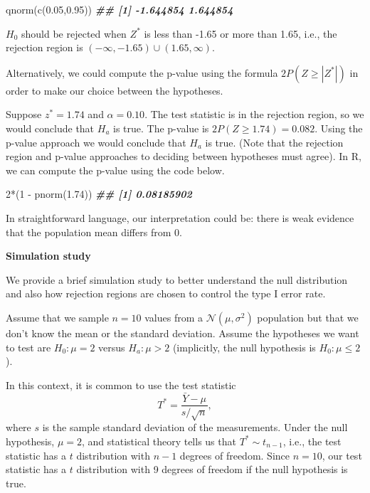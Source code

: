 \documentclass[
]{book}
\newenvironment{Shaded}{\begin{snugshade}}{\end{snugshade}}
\newcommand{\DecValTok}[1]{\textcolor[rgb]{0.00,0.00,0.81}{#1}}
\newcommand{\DocumentationTok}[1]{\textcolor[rgb]{0.56,0.35,0.01}{\textbf{\textit{#1}}}}
\newcommand{\FloatTok}[1]{\textcolor[rgb]{0.00,0.00,0.81}{#1}}
\newcommand{\FunctionTok}[1]{\textcolor[rgb]{0.00,0.00,0.00}{#1}}
\newcommand{\NormalTok}[1]{#1}
\newcommand{\SpecialCharTok}[1]{\textcolor[rgb]{0.00,0.00,0.00}{#1}}
\theoremstyle{definition}
\theoremstyle{definition}
\theoremstyle{definition}
\theoremstyle{definition}
\theoremstyle{remark}
\begin{document}
\begin{Shaded}
\begin{Highlighting}[]
\FunctionTok{qnorm}\NormalTok{(}\FunctionTok{c}\NormalTok{(}\FloatTok{0.05}\NormalTok{,}\FloatTok{0.95}\NormalTok{))}
\DocumentationTok{\#\# [1] {-}1.644854  1.644854}
\end{Highlighting}
\end{Shaded}

\(H_0\) should be rejected when \(Z^*\) is less than -1.65 or more than
1.65, i.e., the rejection region is \((-\infty, -1.65)\cup(1.65,\infty)\).

Alternatively, we could compute the p-value using the formula
\(2P(Z\geq |Z^*|)\) in order to make our choice between the hypotheses.

Suppose \(z^*=1.74\) and \(\alpha=0.10\). The test statistic is in the rejection region, so we would conclude that \(H_a\)
is true. The p-value is \(2P(Z\geq 1.74)=0.082\). Using the p-value approach we would conclude that \(H_a\) is true. (Note that the rejection region and p-value approaches to deciding between hypotheses must agree). In R, we can compute the p-value using the code below.

\begin{Shaded}
\begin{Highlighting}[]
\DecValTok{2}\SpecialCharTok{*}\NormalTok{(}\DecValTok{1} \SpecialCharTok{{-}} \FunctionTok{pnorm}\NormalTok{(}\FloatTok{1.74}\NormalTok{))}
\DocumentationTok{\#\# [1] 0.08185902}
\end{Highlighting}
\end{Shaded}

In straightforward language, our interpretation could be: there is weak evidence that the population mean differs from 0.

\textbf{Simulation study}

We provide a brief simulation study to better understand the null distribution and also how rejection regions are chosen to control the type I error rate.

Assume that we sample \(n=10\) values from a \(\mathcal{N}(\mu, \sigma^2)\) population but that we don't know the mean or the standard deviation. Assume the hypotheses we want to test are \(H_0: \mu = 2\) versus \(H_a: \mu > 2\) (implicitly, the null hypothesis is \(H_0: \mu \leq 2\)).

In this context, it is common to use the test statistic
\[
T^* = \frac{\bar{Y} - \mu}{s/\sqrt{n}},
\]
where \(s\) is the sample standard deviation of the measurements. Under the null hypothesis, \(\mu=2\), and statistical theory tells us that \(T^* \sim t_{n-1}\), i.e., the test statistic has a \(t\) distribution with \(n-1\) degrees of freedom. Since \(n=10\), our test statistic has a \(t\) distribution with 9 degrees of freedom if the null hypothesis is true.
\end{document}
